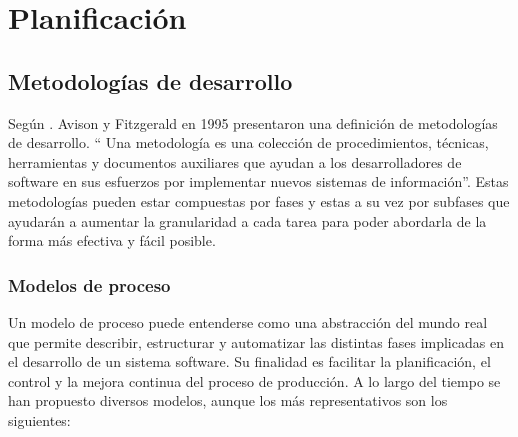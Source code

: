 \raggedbottom
\chapter{Planificación}
\section{Metodologías de desarrollo}
Según \textcite{criteriosSeleccionMetodologiasDesarrollo}. Avison y Fitzgerald en 1995 presentaron una definición de metodologías de desarrollo. `` Una metodología es una colección de procedimientos, técnicas, herramientas y documentos auxiliares que ayudan
a los desarrolladores de software en sus esfuerzos por implementar nuevos sistemas de información''. Estas metodologías pueden estar compuestas por fases y estas a su vez por subfases que ayudarán a aumentar la granularidad a cada tarea para poder abordarla de la forma más efectiva y fácil posible. 

\subsection{Modelos de proceso}

Un modelo de proceso puede entenderse como una abstracción del mundo real que permite describir, estructurar y automatizar las distintas fases implicadas en el desarrollo de un sistema software. Su finalidad es facilitar la planificación, el control y la mejora continua del proceso de producción. A lo largo del tiempo se han propuesto diversos modelos, aunque los más representativos son los siguientes:

